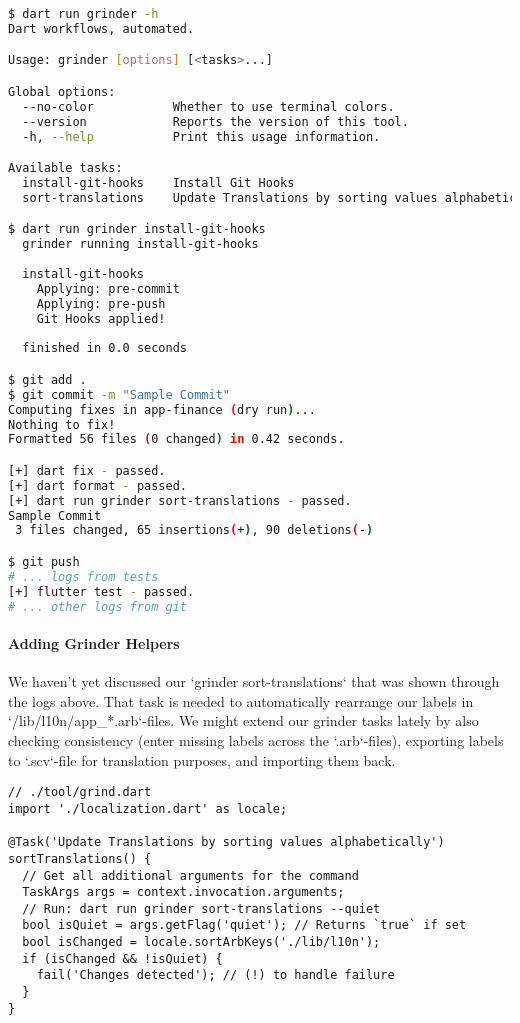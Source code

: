 \begin{lstlisting}[language=bash]
$ dart run grinder -h
Dart workflows, automated.

Usage: grinder [options] [<tasks>...]

Global options:
  --no-color           Whether to use terminal colors.
  --version            Reports the version of this tool.
  -h, --help           Print this usage information.

Available tasks:
  install-git-hooks    Install Git Hooks
  sort-translations    Update Translations by sorting values alphabetically

$ dart run grinder install-git-hooks
  grinder running install-git-hooks
  
  install-git-hooks
    Applying: pre-commit
    Applying: pre-push
    Git Hooks applied!
  
  finished in 0.0 seconds

$ git add .
$ git commit -m "Sample Commit"
Computing fixes in app-finance (dry run)...
Nothing to fix!
Formatted 56 files (0 changed) in 0.42 seconds.

[+] dart fix - passed.
[+] dart format - passed.
[+] dart run grinder sort-translations - passed.
Sample Commit
 3 files changed, 65 insertions(+), 90 deletions(-)

$ git push
# ... logs from tests
[+] flutter test - passed.
# ... other logs from git
\end{lstlisting}


\paragraph{Adding Grinder Helpers}

We haven't yet discussed our `grinder sort-translations` that was shown through the logs above. That task is needed
to automatically rearrange our labels in `/lib/l10n/app\_*.arb`-files. We might extend our grinder tasks lately
by also checking consistency (enter missing labels across the `.arb`-files), exporting labels to `.scv`-file
for translation purposes, and importing them back.

\begin{lstlisting}
// ./tool/grind.dart
import './localization.dart' as locale;

@Task('Update Translations by sorting values alphabetically')
sortTranslations() {
  // Get all additional arguments for the command
  TaskArgs args = context.invocation.arguments;
  // Run: dart run grinder sort-translations --quiet
  bool isQuiet = args.getFlag('quiet'); // Returns `true` if set
  bool isChanged = locale.sortArbKeys('./lib/l10n');
  if (isChanged && !isQuiet) {
    fail('Changes detected'); // (!) to handle failure
  }
}
\end{lstlisting}

